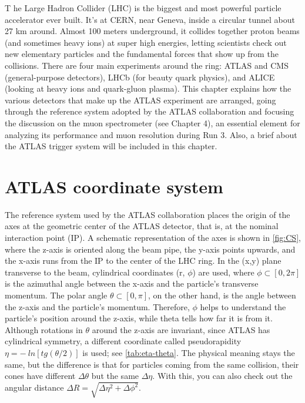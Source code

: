 \documentclass[11pt,a4paper,twoside,openright]{report}
\begin{document}
\lettrine[lines=3,loversize=0.1,lraise=0.05]{T}{} he Large Hadron Collider (LHC) is the biggest and most powerful particle accelerator ever built. It’s at CERN, near Geneva, inside a circular tunnel about 27 km around. Almost 100 meters underground, it collides together proton beams (and sometimes heavy ions) at super high energies, letting scientists check out new elementary particles and the fundamental forces that show up from the collisions. There are four main experiments around the ring: ATLAS and CMS (general-purpose detectors), LHCb (for beauty quark physics), and ALICE (looking at heavy ions and quark-gluon plasma). This chapter explains how the various detectors that make up the ATLAS experiment are arranged, going through the reference system adopted by the ATLAS collaboration and focusing the discussion on the muon spectrometer (see Chapter 4), an essential element for analyzing its performance and muon resolution during Run 3. Also, a brief about the ATLAS trigger system will be included in this chapter. 

\section{ATLAS coordinate system}

The reference system used by the ATLAS collaboration places the origin of the axes at the geometric center of the ATLAS detector, that is, at the nominal interaction point (IP). A schematic representation of the axes is shown in \cref{fig:CS}, where the z-axis is oriented along the beam pipe, the y-axis points upwards, and the x-axis runs from the IP to the center of the LHC ring. In the (x,y) plane transverse to the beam, cylindrical coordinates (r, \(\phi\)) are used, where \(\phi\subset [0,2\pi]\) is the azimuthal angle between the x-axis and the particle's transverse momentum. The polar angle \(\theta \subset [0,\pi]\), on the other hand, is the angle between the z-axis and the particle's momentum. Therefore, \(\phi\) helps to understand the particle's position around the z-axis, while theta tells how far it is from it. Although rotations in \(\theta\) around the z-axis are invariant, since ATLAS has cylindrical symmetry, a different coordinate called pseudorapidity \(\eta = -\ ln \left[ tg\left( \theta/2 \right) \right] \) is used; see \cref{tab:eta-theta}. The physical meaning stays the same, but the difference is that for particles coming from the same collision, their cones have different \(\Delta\theta\) but the same \(\Delta\eta\). With this, you can also check out the angular distance \(\Delta R = \sqrt{\Delta\eta^2 + \Delta\phi^2}\).
\end{document}
